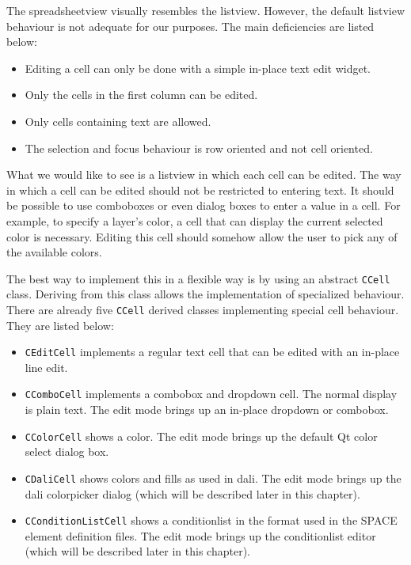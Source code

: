 \bigskip \noindent
The spreadsheetview visually resembles the listview. However, the default
listview behaviour is not adequate for our purposes. The main deficiencies are
listed below:
\begin{itemize}
\item Editing a cell can only be done with a simple in-place text edit widget.
\item Only the cells in the first column can be edited.
\item Only cells containing text are allowed.
\item The selection and focus behaviour is row oriented and not cell oriented.
\end{itemize}
What we would like to see is a listview in which each cell can be edited. The
way in which a cell can be edited should not be restricted to entering text. It
should be possible to use comboboxes or even dialog boxes to enter a value in a
cell. For example, to specify a layer's color, a cell that can display the
current selected color is necessary. Editing this cell should somehow allow the
user to pick any of the available colors.

The best way to implement this in a flexible way is by using an abstract
\verb=CCell= class. Deriving from this class allows the implementation of
specialized behaviour. There are already five \verb=CCell= derived classes
implementing special cell behaviour. They are listed below:

\begin{itemize}
\item \verb=CEditCell= implements a regular text cell that can be edited with
an in-place line edit.
\item \verb=CComboCell= implements a combobox and dropdown cell. The normal
display is plain text. The edit mode brings up an in-place dropdown or
combobox.
\item \verb=CColorCell= shows a color. The edit mode brings up the default Qt
color select dialog box.
\item \verb=CDaliCell= shows colors and fills as used in dali. The edit mode
brings up the dali colorpicker dialog (which will be described later in this
chapter).
\item \verb=CConditionListCell= shows a conditionlist in the format used in the
SPACE element definition files. The edit mode brings up the conditionlist
editor (which will be described later in this chapter).
\end{itemize}

